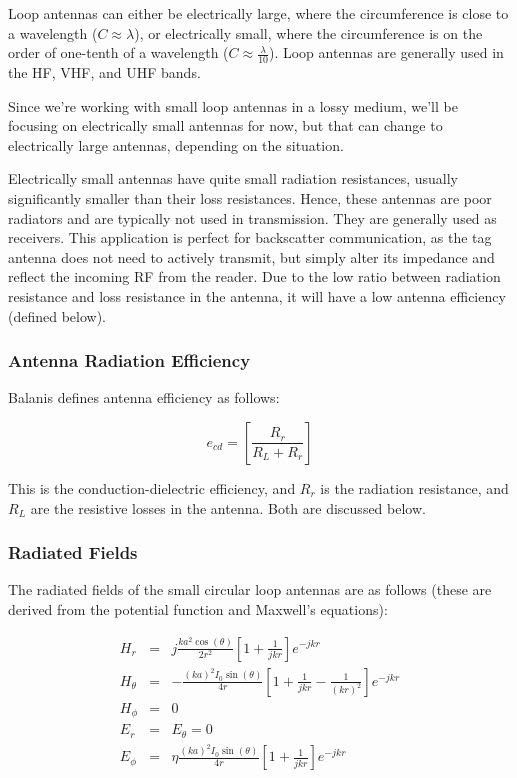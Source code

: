 \documentclass[12pt,onecolumn,titlepage]{article}
\begin{document}
\indent \indent Loop antennas can either be electrically large, where the circumference is close to a wavelength ($C \approx \lambda$), or electrically small, where the circumference is on the order of one-tenth of a wavelength ($C \approx \frac{\lambda}{10}$). Loop antennas are generally used in the HF, VHF, and UHF bands.

Since we're working with small loop antennas in a lossy medium, we'll be focusing on electrically small antennas for now, but that can change to electrically large antennas, depending on the situation.

Electrically small antennas have quite small radiation resistances, usually significantly smaller than their loss resistances. Hence, these antennas are poor radiators and are typically not used in transmission. They are generally used as receivers. This application is perfect for backscatter communication, as the tag antenna does not need to actively transmit, but simply alter its impedance and reflect the incoming RF from the reader. Due to the low ratio between radiation resistance and loss resistance in the antenna, it will have a low antenna efficiency (defined below). 


\subsubsection{Antenna Radiation Efficiency}
\indent \indent Balanis defines antenna efficiency as follows:

\[ e_{cd} = \left[ \frac{R_r}{R_L + R_r} \right] \]

This is the conduction-dielectric efficiency, and $R_r$ is the radiation resistance, and $R_L$ are the resistive losses in the antenna. Both are discussed below.


\subsubsection{Radiated Fields}
\indent \indent The radiated fields of the small circular loop antennas are as follows (these are derived from the potential function and Maxwell's equations):

\begin{eqnarray}
H_r &=& j \frac{k a^2 \cos ( \theta ) }{2r^2} \left[ 1 + \frac{1}{jkr} \right] e^{-jkr} \\
H_\theta &=& - \frac{ \left( ka \right)^2 I_0 \sin ( \theta ) }{4r} \left[ 1 + \frac{1}{jkr} - \frac{1}{\left(kr\right)^2} \right] e^{-jkr} \\
H_\phi &=& 0 \\
E_r &=& E_\theta = 0 \\
E_\phi &=& \eta \frac{\left(ka \right)^2 I_0 \sin ( \theta )}{4r} \left[ 1 + \frac{1}{jkr} \right] e^{-jkr} \\
\end{eqnarray}
\end{document}

